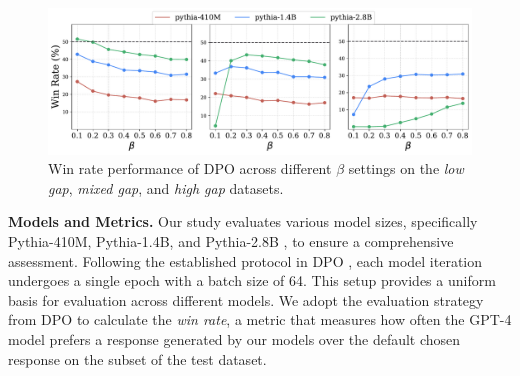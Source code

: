  \begin{figure}[t]
    \vspace{-10pt}
    \centering
    \includegraphics[width=1.0\linewidth]{figs/low_gap_mix_high_gap.pdf}
    \caption{Win rate performance of DPO across different $\beta$ settings on the \emph{low gap}, \emph{mixed gap}, and \emph{high gap} datasets.}
    \label{fig_low_high_gap}
    \vspace{-10pt}
 \end{figure}
 
\textbf{Models and Metrics.} 
Our study evaluates various model sizes, specifically Pythia-410M, Pythia-1.4B, and Pythia-2.8B \cite{pythia}, to ensure a comprehensive assessment. Following the established protocol in DPO \cite{DPO}, each model iteration undergoes a single epoch with a batch size of 64. This setup provides a uniform basis for evaluation across different models.
We adopt the evaluation strategy from DPO \cite{DPO} to calculate the \textit{win rate}, a metric that measures how often the GPT-4 model prefers a response generated by our models over the default chosen response on the subset of the test dataset.

